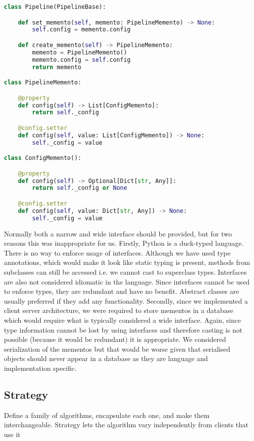 \begin{lstlisting}[language=Python]
class Pipeline(PipelineBase):

	def set_memento(self, memento: PipelineMemento) -> None:
		self.config = memento.config

	def create_memento(self) -> PipelineMemento:
		memento = PipelineMemento()
		memento.config = self.config
		return memento

class PipelineMemento:

	@property
	def config(self) -> List[ConfigMemento]:
		return self._config

	@config.setter
	def config(self, value: List[ConfigMemento]) -> None:
		self._config = value

class ConfigMemento():

	@property
	def config(self) -> Optional[Dict[str, Any]]:
		return self._config or None

	@config.setter
	def config(self, value: Dict[str, Any]) -> None:
		self._config = value
\end{lstlisting}

Normally both a narrow and wide interface should be provided, but for two reasons this was inappropriate for us.
Firstly, Python is a duck-typed language. There is no way to enforce usage of interfaces. Although we have used
type annotations, which would make it look like static typing is present, methods from subclasses can still be
accessed i.e. we cannot cast to superclass types. Interfaces are also not considered idiomatic in the language.
Since interfaces cannot be used to enforce types, they are redundant and have no benefit.
Abstract classes are usually preferred if they add any functionality.
Secondly, since we implemented a client server architecture, we were required to store mementos in a database which
would require what is typically considered a wide interface. Again, since type information cannot be lost by
using interfaces and therefore casting is not possible (because it would be redundant) it is appropriate.
We considered serialization of the mementos but that would be worse given that serialised objects should never
appear in a database as they are language and implementation specific.

\subsection{Strategy}
Define a family of algorithms, encapsulate each one, and make them interchangeable. Strategy lets the
algorithm vary independently from clients that use it~\citep{OODesign}

